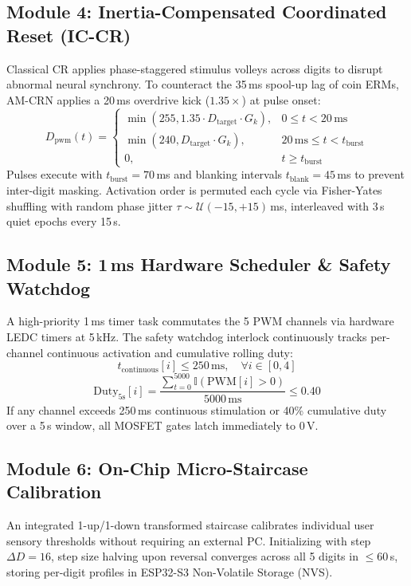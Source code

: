 \documentclass[10pt,twocolumn]{article}
\begin{document}
\subsection{Module 4: Inertia-Compensated Coordinated Reset (IC-CR)}
Classical CR applies phase-staggered stimulus volleys across digits to disrupt abnormal neural synchrony. To counteract the 35\,ms spool-up lag of coin ERMs, AM-CRN applies a 20\,ms overdrive kick ($1.35\times$) at pulse onset:
\begin{equation}
D_{\text{pwm}}(t) = \begin{cases} 
\min\left(255, 1.35 \cdot D_{\text{target}} \cdot G_k\right), & 0 \le t < 20\,\text{ms} \\
\min\left(240, D_{\text{target}} \cdot G_k\right), & 20\,\text{ms} \le t < t_{\text{burst}} \\
0, & t \ge t_{\text{burst}}
\end{cases}
\end{equation}
Pulses execute with $t_{\text{burst}} = 70$\,ms and blanking intervals $t_{\text{blank}} = 45$\,ms to prevent inter-digit masking. Activation order is permuted each cycle via Fisher-Yates shuffling with random phase jitter $\tau \sim \mathcal{U}(-15, +15)$\,ms, interleaved with 3\,s quiet epochs every 15\,s.

\subsection{Module 5: 1\,ms Hardware Scheduler \& Safety Watchdog}
A high-priority 1\,ms timer task commutates the 5 PWM channels via hardware LEDC timers at 5\,kHz. The safety watchdog interlock continuously tracks per-channel continuous activation and cumulative rolling duty:
\begin{equation}
t_{\text{continuous}}[i] \le 250\,\text{ms}, \quad \forall i \in [0, 4]
\end{equation}
\begin{equation}
\text{Duty}_{5\text{s}}[i] = \frac{\sum_{t=0}^{5000} \mathbb{I}(\text{PWM}[i] > 0)}{5000\,\text{ms}} \le 0.40
\end{equation}
If any channel exceeds 250\,ms continuous stimulation or 40\% cumulative duty over a 5\,s window, all MOSFET gates latch immediately to 0\,V.

\subsection{Module 6: On-Chip Micro-Staircase Calibration}
An integrated 1-up/1-down transformed staircase calibrates individual user sensory thresholds without requiring an external PC. Initializing with step $\Delta D = 16$, step size halving upon reversal converges across all 5 digits in $\le 60$\,s, storing per-digit profiles in ESP32-S3 Non-Volatile Storage (NVS).
\end{document}
